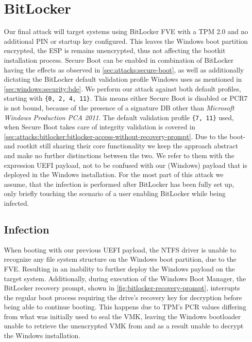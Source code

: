 \section{BitLocker}

Our final attack will target systems using BitLocker \ac{FVE} with a \ac{TPM} 2.0 and no additional PIN or startup key configured.
This leaves the Windows boot partition encrypted, the \ac{ESP} is remains unencrypted, thus not affecting the bootkit installation process.
Secure Boot can be enabled in combination of BitLocker having the effects as observed in \autoref{sec:attacks:secure-boot}, as well as additionally dictating the BitLocker default validation profile Windows uses as mentioned in \autoref{sec:windows:security:bde}.
We perform our attack against both default profiles, starting with \lstinline|{0, 2, 4, 11}|.
This means either Secure Boot is disabled or \ac{PCR}7 is not bound, because of the presence of a signature \ac{DB} other than \emph{Microsoft Windows Production PCA 2011}.
The default validation profile \lstinline|{7, 11}| used, when Secure Boot takes care of integrity validation is covered in \autoref{sec:attacks:bitlocker:bitlocker-access-without-recovery-prompt}.
Due to the boot- and rootkit still sharing their core functionality we keep the approach abstract and make no further distinctions between the two.
We refer to them with the expression \ac{UEFI} payload, not to be confused with our (Windows) payload that is deployed in the Windows installation.
For the most part of this attack we assume, that the infection is performed after BitLocker has been fully set up, only briefly touching the scenario of a user enabling BitLocker while being infected.


\subsection{Infection}

When booting with our previous \ac{UEFI} payload, the \ac{NTFS} driver is unable to recognize any file system structure  on the Windows boot partition, due to the \ac{FVE}.
Resulting in an inability to further deploy the Windows payload on the target system.
Additionally, during execution of the Windows Boot Manager, the BitLocker recovery prompt, shown in \autoref{fig:bitlocker-recovery-prompt}, interrupts the regular boot process requiring the drive's recovery key for decryption before being able to continue booting.
This happens due to \ac{TPM}'s \ac{PCR} values differing from what was initially used to seal the \ac{VMK}, leaving the Windows bootloader unable to retrieve the unencrypted \ac{VMK} from and as a result unable to decrypt the Windows installation\cite[12.]{windows-internals-7-part2}.


